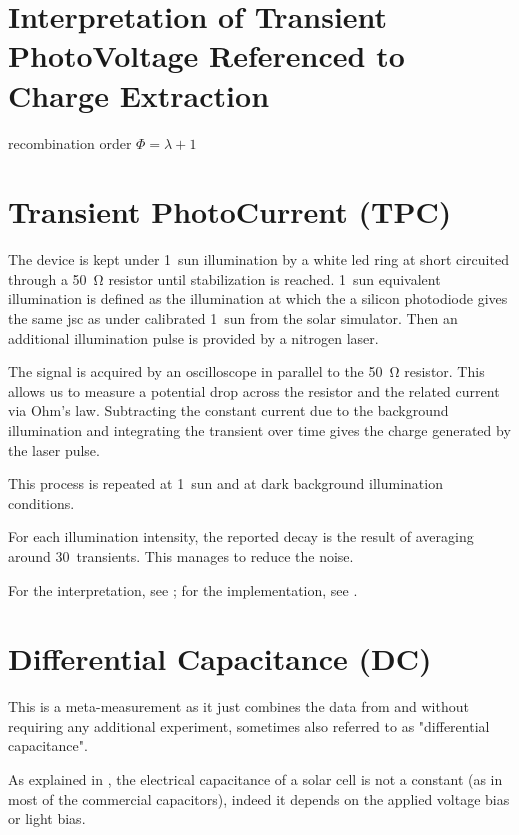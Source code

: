 \section{Interpretation of Transient PhotoVoltage Referenced to Charge Extraction}\label{interpretation_tpvce}

recombination order $\Phi = \lambda + 1$ \cite{Shuttle2008d,Credgington2011}



\section{Transient PhotoCurrent (TPC)}

	The device is kept under 1~sun illumination by a white \gls{led} ring at short circuited through a \SI{50}{\ohm} resistor until stabilization is reached. 1~sun equivalent illumination is defined as the illumination at which the a silicon photodiode gives the same \gls{jsc} as under calibrated 1~sun from the solar simulator. Then an additional illumination pulse is provided by a nitrogen laser.

	The signal is acquired by an oscilloscope in parallel to the \SI{50}{\ohm} resistor. This allows us to measure a potential drop across the resistor and the related current via Ohm's law. Subtracting the constant current due to the background illumination and integrating the transient over time gives the charge generated by the laser pulse.

	This process is repeated at 1~sun and at dark background illumination conditions.

	For each illumination intensity, the reported decay is the result of averaging around 30~transients. This manages to reduce the noise.

	For the interpretation, see ; for the implementation, see .

\section{Differential Capacitance (DC)}

	This is a meta-measurement as it just combines the data from  and  without requiring any additional experiment\cite{Shuttle2008}, sometimes also referred to as "differential capacitance".

	As explained in , the electrical capacitance of a solar cell is not a constant (as in most of the commercial capacitors), indeed it depends on the applied voltage bias or light bias.

